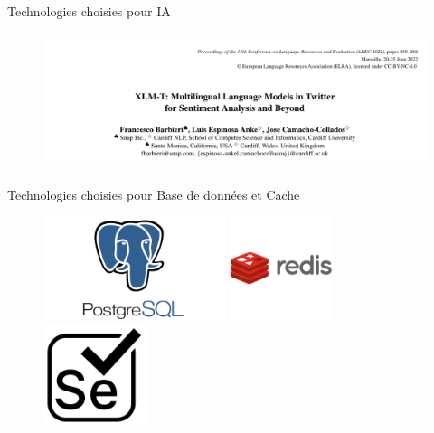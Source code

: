 \begin{frame}{Technologies choisies pour IA}
    \begin{figure}[H]
        \centering

       
            \includegraphics[height=4cm]{assets/images/ai-name.png}
    
      
    \end{figure}
\end{frame}

\begin{frame}{Technologies choisies pour Base de données et Cache}
    \begin{figure}[H]
        \centering
        \begin{minipage}{0.3\textwidth}
            \centering
            \includegraphics[height=3cm]{assets/images/postgres.png}
        \end{minipage}%
        \hspace{0.05\textwidth}
        \begin{minipage}{0.3\textwidth}
            \centering
            \includegraphics[height=3cm]{assets/images/redis.png}
        \end{minipage}%
        \hspace{0.05\textwidth}
        \begin{minipage}{0.3\textwidth}
            \centering
            \includegraphics[height=3cm]{assets/images/selenium.png}
        \end{minipage}
    \end{figure}
\end{frame}
